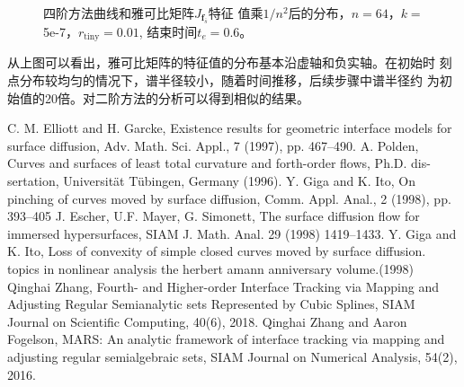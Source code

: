 \documentclass[a4paper,twoside]{ctexart}
\begin{document}
\begin{figure}[H]
{    }
	\\
    \caption{四阶方法曲线和雅可比矩阵$J_{\boldsymbol f_{\bar{s}}}$特征
      值乘$1/n^2$后的分布，$n=64$，$k=$ 5e-7，$r_\mathrm{tiny}=0.01$,
      结束时间$t_e = 0.6$。}
    \label{fig:Eigenvlaues}
  \end{figure}
  从上图可以看出，雅可比矩阵的特征值的分布基本沿虚轴和负实轴。在初始时
  刻点分布较均匀的情况下，谱半径较小，随着时间推移，后续步骤中谱半径约
  为初始值的20倍。对二阶方法的分析可以得到相似的结果。
\newpage
\begin{thebibliography}{99}  
C. M. Elliott and H. Garcke, Existence results for geometric interface models for surface
diffusion, Adv. Math. Sci. Appl., 7 (1997), pp. 467–490.
A. Polden, Curves and surfaces of least total curvature and forth-order flows, Ph.D. dis-
sertation, Universität Tübingen, Germany (1996).
Y. Giga and K. Ito, On pinching of curves moved by surface diffusion, Comm. Appl. Anal.,
2 (1998), pp. 393–405
J. Escher, U.F. Mayer, G. Simonett, The surface diﬀusion ﬂow for immersed hypersurfaces, SIAM J. Math. Anal. 29 (1998) 1419–1433.
Y. Giga and K. Ito, Loss of convexity of simple closed
  curves moved by surface diffusion. topics in nonlinear analysis the
  herbert amann anniversary volume.(1998)
Qinghai Zhang, Fourth- and Higher-order Interface Tracking via Mapping and Adjusting Regular Semianalytic sets Represented by Cubic Splines, SIAM Journal on Scientific Computing, 40(6), 2018.
Qinghai Zhang and Aaron Fogelson, MARS: An analytic framework of interface tracking via mapping and adjusting regular semialgebraic sets, SIAM Journal on Numerical Analysis, 54(2), 2016.

\end{thebibliography}
\end{document}
